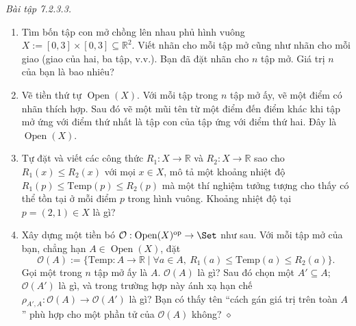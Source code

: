 \noindent\textit{Bài tập 7.2.3.3.}\keepwithnext
\begin{enumerate}[label=\alph*.]
\item Tìm bốn tập con mở chồng lên nhau phủ hình vuông $X:=[0,3]\times[0,3]\subseteq\mathbb R^2$. Viết nhãn cho mỗi tập mở cũng như nhãn cho mỗi giao (giao của hai, ba tập, v.v.). Bạn đã đặt nhãn cho $n$ tập mở. Giá trị $n$ của bạn là bao nhiêu?
\item Vẽ tiền thứ tự $\operatorname{Open}(X)$. Với mỗi tập trong $n$ tập mở ấy, vẽ một điểm có nhãn thích hợp. Sau đó vẽ một mũi tên từ một điểm đến điểm khác khi tập mở ứng với điểm thứ nhất là tập con của tập ứng với điểm thứ hai. Đây là $\operatorname{Open}(X)$.
\item Tự đặt và viết các công thức $R_1:X\to\mathbb R$ và $R_2:X\to\mathbb R$ sao cho $R_1(x)\le R_2(x)$ với mọi $x\in X$, mô tả một khoảng nhiệt độ $R_1(p)\le\mathrm{Temp}(p)\le R_2(p)$ mà một thí nghiệm tưởng tượng cho thấy có thể tồn tại ở mỗi điểm $p$ trong hình vuông. Khoảng nhiệt độ tại $p=(2,1)\in X$ là gì?
\item Xây dựng một tiền bó $\mathcal O:\operatorname{Open}(X)^{\mathrm{op}}\to\Set$ như sau. Với mỗi tập mở của bạn, chẳng hạn $A\in\operatorname{Open}(X)$, đặt
\[
\mathcal O(A):=\{\mathrm{Temp}:A\to\mathbb R\mid\forall a\in A,\ R_1(a)\le\mathrm{Temp}(a)\le R_2(a)\}.
\]
Gọi một trong $n$ tập mở ấy là $A$. $\mathcal O(A)$ là gì? Sau đó chọn một $A'\subseteq A$; $\mathcal O(A')$ là gì, và trong trường hợp này ánh xạ hạn chế $\rho_{A',A}:\mathcal O(A)\to\mathcal O(A')$ là gì? Bạn có thấy tên ``cách gán giá trị trên toàn $A$'' phù hợp cho một phần tử của $\mathcal O(A)$ không?
\nobreak\hfill$\diamond$
\end{enumerate}

